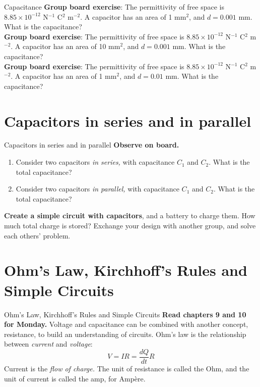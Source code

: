 \documentclass{beamer}
\begin{document}
\begin{frame}{Capacitance}
\textbf{Group board exercise}: The permittivity of free space is $8.85 \times 10^{-12}$ N$^{-1}$ C$^2$ m$^{-2}$.  A capacitor has an area of 1 mm$^2$, and $d = 0.001$ mm.  What is the capacitance? \\ 
\textbf{Group board exercise}: The permittivity of free space is $8.85 \times 10^{-12}$ N$^{-1}$ C$^2$ m$^{-2}$.  A capacitor has an area of 10 mm$^2$, and $d = 0.001$ mm.  What is the capacitance? \\
\textbf{Group board exercise}: The permittivity of free space is $8.85 \times 10^{-12}$ N$^{-1}$ C$^2$ m$^{-2}$.  A capacitor has an area of 1 mm$^2$, and $d = 0.01$ mm.  What is the capacitance?
\end{frame}

\section{Capacitors in series and in parallel}

\begin{frame}{Capacitors in series and in parallel}
\textbf{Observe on board.}
\begin{enumerate}
\item Consider two capacitors \textit{in series,} with capacitance $C_1$ and $C_2$.  What is the total capacitance?
\item Consider two capacitors \textit{in parallel,} with capacitance $C_1$ and $C_2$.  What is the total capacitance?
\end{enumerate}
\textbf{Create a simple circuit with capacitors}, and a battery to charge them.  How much total charge is stored?  Exchange your design with another group, and solve each others' problem.
\end{frame}

\section{Ohm's Law, Kirchhoff's Rules and Simple Circuits}

\begin{frame}{Ohm's Law, Kirchhoff's Rules and Simple Circuits}
\textbf{Read chapters 9 and 10 for Monday.}
Voltage and capacitance can be combined with another concept, \alert{resistance}, to build an understanding of \alert{circuits}.  Ohm's law is the relationship between \textit{current} and \textit{voltage}:
\begin{equation}
V = I R = \frac{dQ}{dt}R
\end{equation}
Current is the \textit{flow of charge.}  The unit of resistance is called the Ohm, and the unit of current is called the amp, for Amp\`{e}re.
\end{frame}
\end{document}
